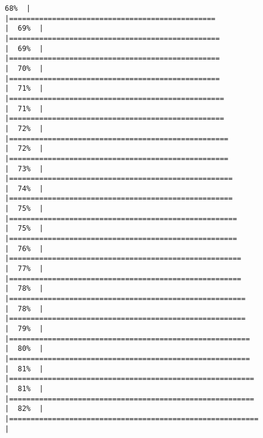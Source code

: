 \documentclass[
]{book}
\begin{document}
\begin{verbatim}
68%  |                                                                              |================================================                      |  69%  |                                                                              |=================================================                     |  69%  |                                                                              |=================================================                     |  70%  |                                                                              |=================================================                     |  71%  |                                                                              |==================================================                    |  71%  |                                                                              |==================================================                    |  72%  |                                                                              |===================================================                   |  72%  |                                                                              |===================================================                   |  73%  |                                                                              |====================================================                  |  74%  |                                                                              |====================================================                  |  75%  |                                                                              |=====================================================                 |  75%  |                                                                              |=====================================================                 |  76%  |                                                                              |======================================================                |  77%  |                                                                              |======================================================                |  78%  |                                                                              |=======================================================               |  78%  |                                                                              |=======================================================               |  79%  |                                                                              |========================================================              |  80%  |                                                                              |========================================================              |  81%  |                                                                              |=========================================================             |  81%  |                                                                              |=========================================================             |  82%  |                                                                              |==========================================================            |  
\end{verbatim}
\end{document}
